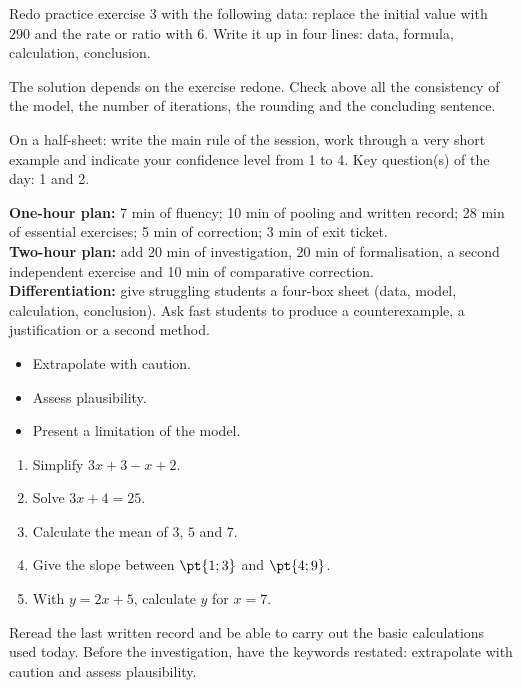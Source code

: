 
\begin{homework}Redo practice exercise 3 with the following data: replace the initial value with $290$ and the rate or ratio with $6$. Write it up in four lines: data, formula, calculation, conclusion.\end{homework}
\begin{solution}The solution depends on the exercise redone. Check above all the consistency of the model, the number of iterations, the rounding and the concluding sentence.\end{solution}

\begin{exitticket}[3 minutes]On a half-sheet: write the main rule of the session, work through a very short example and indicate your confidence level from 1 to 4. Key question(s) of the day: 1 and 2.\end{exitticket}

\ifmxteacher
\begin{method}
\textbf{One-hour plan:} 7 min of fluency; 10 min of pooling and written record; 28 min of essential exercises; 5 min of correction; 3 min of exit ticket.\\
\textbf{Two-hour plan:} add 20 min of investigation, 20 min of formalisation, a second independent exercise and 10 min of comparative correction.\\
\textbf{Differentiation:} give struggling students a four-box sheet (data, model, calculation, conclusion). Ask fast students to produce a counterexample, a justification or a second method.
\end{method}
\fi
{}
\begin{objectives}\begin{itemize}\item Extrapolate with caution.\item Assess plausibility.\item Present a limitation of the model.\end{itemize}\end{objectives}
\begin{fluency}\begin{enumerate}\item Simplify $3x+3-x+2$. \item Solve $3x+4=25$. \item Calculate the mean of $3$, $5$ and $7$. \item Give the slope between $\pt{1;3}$ and $\pt{4;9}$. \item With $y=2x+5$, calculate $y$ for $x=7$. \end{enumerate}\end{fluency}
\begin{prerequisites}Reread the last written record and be able to carry out the basic calculations used today. Before the investigation, have the keywords restated: extrapolate with caution and assess plausibility.\end{prerequisites}

